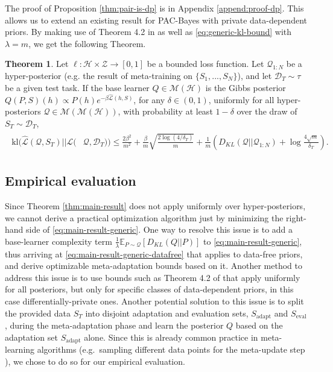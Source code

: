 \documentclass{article} %
\theoremstyle{definition}
\newtheorem{theorem}{Theorem}[section]
\newcommand{\Expect}[2]{\mathbb{E}_{#1}\left [#2 \right ]}
\begin{document}
The proof of Proposition \ref{thm:pair-is-dp} is in Appendix \ref{append:proof-dp}. This  allows us to extend an existing result for PAC-Bayes with private data-dependent priors.
By making use of Theorem 4.2 in \citet{Dziugaite2018} as well as  \eqref{eq:generic-kl-bound} with $\lambda=m$, we get the following Theorem.

\begin{theorem} \label{thm:kl-main-result}
	Let $\ell:\mathcal{H}\times \mathcal{Z}\rightarrow [0,1]$ be a bounded loss function.
	Let $\mathcal{Q}_{1:N}$ be a hyper-posterior (e.g. the result of meta-training on $\{S_1,...,S_N\}$), and let $\mathcal{D}_T\sim \tau$ be a given test task. 
	If the base learner $Q\in \mathcal{M}(\mathcal{H})$ is the Gibbs posterior $Q(P, S)(h)\propto P(h)e^{-\beta\hat{\mathcal{L}}(h, S)}$, 
	for any $\delta\in(0,1)$, uniformly for all hyper-posteriors $\mathcal{Q}\in \mathcal{M}(\mathcal{M}(\mathcal{H}))$, with probability at least $1-\delta$ over the draw of $S_T\sim \mathcal{D}_T$,
%
	\begin{align*} 
	\begin{split}
	\mathrm{kl}(\hat{\mathcal{L}}(\mathcal{Q},S_T)||\mathcal{L}(&\mathcal{Q},\mathcal{D}_T))\leq \frac{2\beta^2}{m^2}+\frac{\beta}{m}\sqrt{\frac{2\log (4/\delta_T)}{m}} 
	+\frac{1}{m}\left (D_{KL}(\mathcal{Q}||\mathcal{Q}_{1:N})+\log\frac{4\sqrt{m}}{\delta_T} \right ) .
	\end{split}
	\end{align*}
	
\end{theorem}

\subsection{Empirical evaluation}

Since Theorem \ref{thm:main-result} does not apply uniformly over hyper-posteriors, we cannot derive a practical optimization algorithm just by minimizing the right-hand side of  \eqref{eq:main-result-generic}. 
One way to resolve this issue is to add a base-learner complexity term $\frac{1}{\lambda}\Expect{P\sim \mathcal{Q}}{D_{KL}(Q||P)}$ to  \eqref{eq:main-result-generic}, thus arriving at \eqref{eq:main-result-generic-datafree} that applies to data-free priors, and derive optimizable meta-adaptation bounds based on it.
Another method to address this issue is to use bounds such as Theorem 4.2 of \citet{Dziugaite2018} that apply uniformly for all posteriors, but only for specific classes of data-dependent priors, in this case differentially-private ones.
Another potential solution to this issue is to split the provided data $S_T$ into disjoint adaptation and evaluation sets, $S_{\mathrm{adapt}}$ and $S_{\mathrm{eval}}$, during the meta-adaptation phase and learn the posterior $Q$ based on the adaptation set $S_{\mathrm{adapt}}$ alone. Since this is already common practice in meta-learning algorithms (e.g.\ sampling different data points for the meta-update step \citet{Finn2017}), we chose to do so for our empirical evaluation. %
\end{document}

